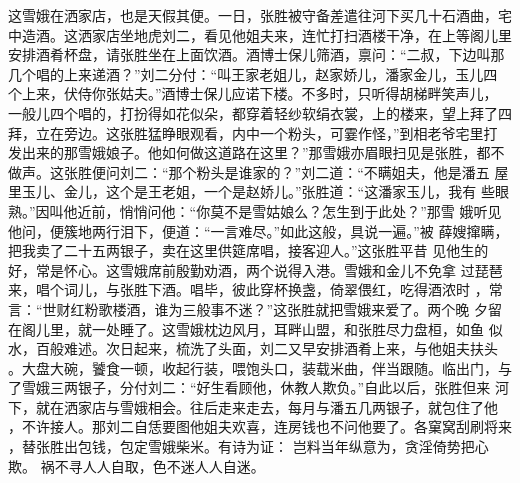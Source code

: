 这雪娥在洒家店，也是天假其便。一日，张胜被守备差遣往河下买几十石酒曲，宅
中造酒。这洒家店坐地虎刘二，看见他姐夫来，连忙打扫酒楼干净，在上等阁儿里
安排酒肴杯盘，请张胜坐在上面饮酒。酒博士保儿筛酒，禀问：“二叔，下边叫那
几个唱的上来递酒？”刘二分付：“叫王家老姐儿，赵家娇儿，潘家金儿，玉儿四
个上来，伏侍你张姑夫。”酒博士保儿应诺下楼。不多时，只听得胡梯畔笑声儿，
一般儿四个唱的，打扮得如花似朵，都穿着轻纱软绢衣裳，上的楼来，望上拜了四
拜，立在旁边。这张胜猛睁眼观看，内中一个粉头，可霎作怪，”到相老爷宅里打
发出来的那雪娥娘子。他如何做这道路在这里？”那雪娥亦眉眼扫见是张胜，都不
做声。这张胜便问刘二：“那个粉头是谁家的？”刘二道：“不瞒姐夫，他是潘五
屋里玉儿、金儿，这个是王老姐，一个是赵娇儿。”张胜道：“这潘家玉儿，我有
些眼熟。”因叫他近前，悄悄问他：“你莫不是雪姑娘么？怎生到于此处？”那雪
娥听见他问，便簇地两行泪下，便道：“一言难尽。”如此这般，具说一遍。”被
薛嫂撺瞒，把我卖了二十五两银子，卖在这里供筵席唱，接客迎人。”这张胜平昔
见他生的好，常是怀心。这雪娥席前殷勤劝酒，两个说得入港。雪娥和金儿不免拿
过琵琶来，唱个词儿，与张胜下酒。唱毕，彼此穿杯换盏，倚翠偎红，吃得酒浓时
，常言：“世财红粉歌楼酒，谁为三般事不迷？”这张胜就把雪娥来爱了。两个晚
夕留在阁儿里，就一处睡了。这雪娥枕边风月，耳畔山盟，和张胜尽力盘桓，如鱼
似水，百般难述。次日起来，梳洗了头面，刘二又早安排酒肴上来，与他姐夫扶头
。大盘大碗，饕食一顿，收起行装，喂饱头口，装载米曲，伴当跟随。临出门，与
了雪娥三两银子，分付刘二：“好生看顾他，休教人欺负。”自此以后，张胜但来
河下，就在洒家店与雪娥相会。往后走来走去，每月与潘五几两银子，就包住了他
，不许接人。那刘二自恁要图他姐夫欢喜，连房钱也不问他要了。各窠窝刮刷将来
，替张胜出包钱，包定雪娥柴米。有诗为证：
岂料当年纵意为，贪淫倚势把心欺。
祸不寻人人自取，色不迷人人自迷。